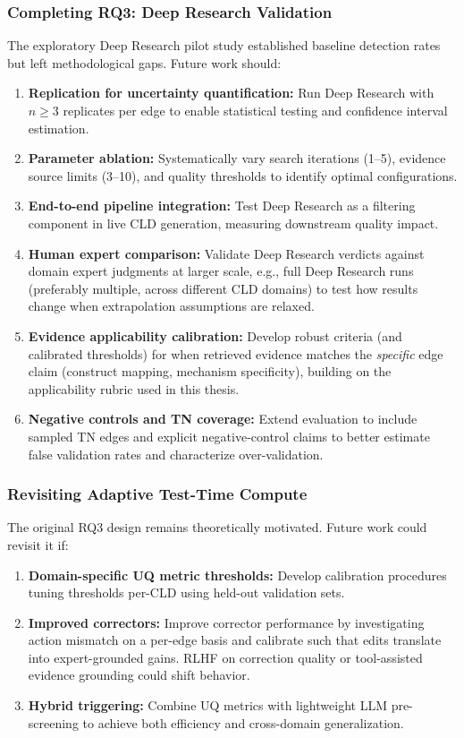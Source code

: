 \subsubsection{Completing RQ3: Deep Research Validation}

The exploratory Deep Research pilot study established baseline detection rates but left methodological gaps. Future work should:
\begin{enumerate}[noitemsep]
    \item \textbf{Replication for uncertainty quantification:} Run Deep Research with $n \geq 3$ replicates per edge to enable statistical testing and confidence interval estimation.
    \item \textbf{Parameter ablation:} Systematically vary search iterations (1--5), evidence source limits (3--10), and quality thresholds to identify optimal configurations.
    \item \textbf{End-to-end pipeline integration:} Test Deep Research as a filtering component in live CLD generation, measuring downstream quality impact.
    \item \textbf{Human expert comparison:} Validate Deep Research verdicts against domain expert judgments at larger scale, e.g., full Deep Research runs (preferably multiple, across different CLD domains) to test how results change when extrapolation assumptions are relaxed.
    \item \textbf{Evidence applicability calibration:} Develop robust criteria (and calibrated thresholds) for when retrieved evidence matches the \textit{specific} edge claim (construct mapping, mechanism specificity), building on the applicability rubric used in this thesis.
    \item \textbf{Negative controls and TN coverage:} Extend evaluation to include sampled TN edges and explicit negative-control claims to better estimate false validation rates and characterize over-validation.
\end{enumerate}

\subsubsection{Revisiting Adaptive Test-Time Compute}

The original RQ3 design remains theoretically motivated. Future work could revisit it if:
\begin{enumerate}[noitemsep]
    \item \textbf{Domain-specific UQ metric thresholds:} Develop calibration procedures tuning thresholds per-CLD using held-out validation sets.
    \item \textbf{Improved correctors:} Improve corrector performance by investigating action mismatch on a per-edge basis and calibrate such that edits translate into expert-grounded gains. RLHF on correction quality or tool-assisted evidence grounding could shift behavior.
    \item \textbf{Hybrid triggering:} Combine UQ metrics with lightweight LLM pre-screening to achieve both efficiency and cross-domain generalization.
\end{enumerate}


